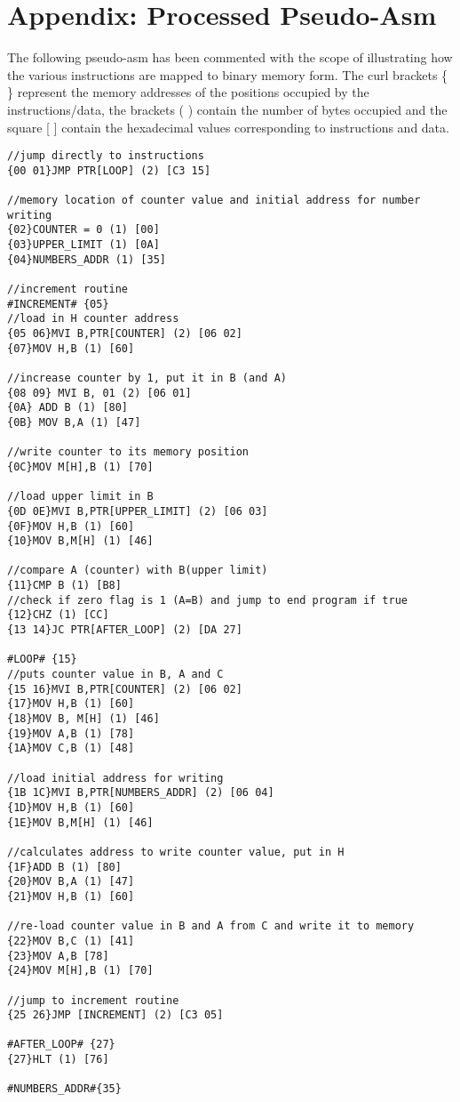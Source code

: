 \section{Appendix: Processed Pseudo-Asm} \label{sec:appendix}
The following pseudo-asm has been commented with the scope of illustrating how the various instructions are mapped to binary memory form.
The curl brackets \{ \} represent the memory addresses of the positions occupied by the
instructions/data, the brackets ( ) contain the number of bytes occupied and the square [ ] contain the hexadecimal values corresponding to instructions and data.
\begin{verbatim}
//jump directly to instructions
{00 01}JMP PTR[LOOP] (2) [C3 15]

//memory location of counter value and initial address for number writing
{02}COUNTER = 0 (1) [00]
{03}UPPER_LIMIT (1) [0A]
{04}NUMBERS_ADDR (1) [35]

//increment routine
#INCREMENT# {05}
//load in H counter address
{05 06}MVI B,PTR[COUNTER] (2) [06 02]
{07}MOV H,B (1) [60]

//increase counter by 1, put it in B (and A)
{08 09} MVI B, 01 (2) [06 01]
{0A} ADD B (1) [80]
{0B} MOV B,A (1) [47]

//write counter to its memory position
{0C}MOV M[H],B (1) [70]

//load upper limit in B
{0D 0E}MVI B,PTR[UPPER_LIMIT] (2) [06 03]
{0F}MOV H,B (1) [60]
{10}MOV B,M[H] (1) [46]

//compare A (counter) with B(upper limit)
{11}CMP B (1) [B8]
//check if zero flag is 1 (A=B) and jump to end program if true
{12}CHZ (1) [CC]
{13 14}JC PTR[AFTER_LOOP] (2) [DA 27]

#LOOP# {15}
//puts counter value in B, A and C
{15 16}MVI B,PTR[COUNTER] (2) [06 02]
{17}MOV H,B (1) [60]
{18}MOV B, M[H] (1) [46]
{19}MOV A,B (1) [78]
{1A}MOV C,B (1) [48]

//load initial address for writing
{1B 1C}MVI B,PTR[NUMBERS_ADDR] (2) [06 04]
{1D}MOV H,B (1) [60]
{1E}MOV B,M[H] (1) [46]

//calculates address to write counter value, put in H
{1F}ADD B (1) [80]
{20}MOV B,A (1) [47]
{21}MOV H,B (1) [60]

//re-load counter value in B and A from C and write it to memory
{22}MOV B,C (1) [41]
{23}MOV A,B [78]
{24}MOV M[H],B (1) [70]

//jump to increment routine
{25 26}JMP [INCREMENT] (2) [C3 05]

#AFTER_LOOP# {27}
{27}HLT (1) [76]

#NUMBERS_ADDR#{35}

\end{verbatim}